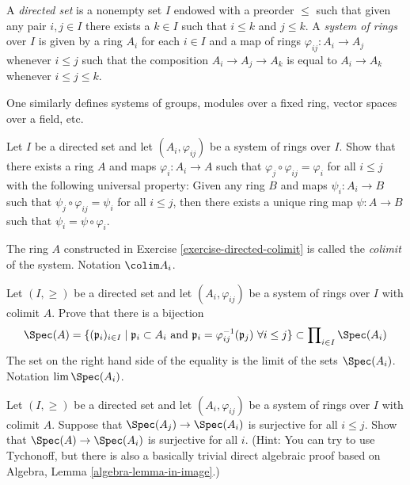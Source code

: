 \begin{definition}
\label{definition-directed-poset}
A {\it directed set} is a nonempty set $I$ endowed with a preorder $\leq$
such that given any pair $i, j \in I$ there exists a $k \in I$ such that
$i \leq k$ and $j \leq k$. A {\it system of rings} over $I$ is given by a
ring $A_i$ for each $i \in I$ and a map of rings $\varphi_{ij} : A_i \to A_j$
whenever $i \leq j$ such that the composition $A_i \to A_j \to A_k$ is equal to
$A_i \to A_k$ whenever $i \leq j \leq k$.
\end{definition}

\noindent
One similarly defines systems of groups, modules over a fixed ring,
vector spaces over a field, etc.

\begin{exercise}
\label{exercise-directed-colimit}
Let $I$ be a directed set and let
$(A_i, \varphi_{ij})$ be a system of rings over $I$.
Show that there exists a ring $A$ and maps $\varphi_i : A_i \to A$
such that $\varphi_j \circ \varphi_{ij} = \varphi_i$ for all $i \leq j$
with the following universal property: Given any ring $B$
and maps $\psi_i : A_i \to B$ such that
$\psi_j \circ \varphi_{ij} = \psi_i$ for all $i \leq j$, then
there exists a unique ring map $\psi : A \to B$ such that
$\psi_i = \psi \circ \varphi_i$.
\end{exercise}

\begin{definition}
\label{definition-colimit}
The ring $A$ constructed in Exercise \ref{exercise-directed-colimit}
is called the {\it colimit} of the system. Notation $\colim A_i$.
\end{definition}

\begin{exercise}
\label{exercise-prime-in-colimit}
Let $(I, \geq)$ be a directed set and let
$(A_i, \varphi_{ij})$ be a system of rings over $I$ with colimit
$A$. Prove that there is a bijection
$$
\Spec(A) = \{(\mathfrak p_i)_{i \in I} \mid
\mathfrak p_i \subset A_i \text{ and }
\mathfrak p_i = \varphi_{ij}^{-1}(\mathfrak p_j)\ \forall i \leq j\}
\subset \prod\nolimits_{i \in I} \Spec(A_i)
$$
The set on the right hand side of the equality is the limit of the sets
$\Spec(A_i)$. Notation $\lim \Spec(A_i)$.
\end{exercise}

\begin{exercise}
\label{exercise-colimit-surjective}
Let $(I, \geq)$ be a directed set and let
$(A_i, \varphi_{ij})$ be a system of rings over $I$ with colimit
$A$. Suppose that $\Spec(A_j) \to \Spec(A_i)$ is
surjective for all $i \leq j$. Show that
$\Spec(A) \to \Spec(A_i)$ is surjective for all $i$.
(Hint: You can try to use Tychonoff, but there is also a basically trivial
direct algebraic proof based on
Algebra, Lemma \ref{algebra-lemma-in-image}.)
\end{exercise}

